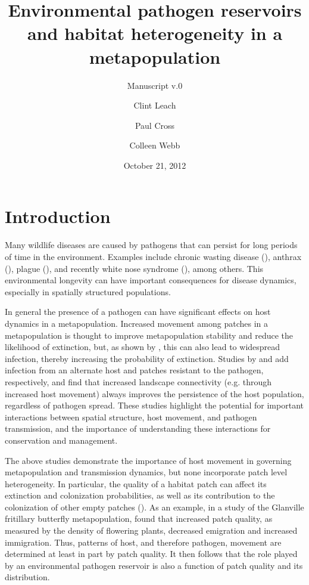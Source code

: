 \documentclass{svjour3}
\begin{document}
\title{Environmental pathogen reservoirs and habitat heterogeneity in a metapopulation}
\subtitle{Manuscript v.0}

\author{Clint Leach \and Paul Cross \and Colleen Webb}


\date{October 21, 2012}


\maketitle

\section{Introduction}
\label{intro}

Many wildlife diseases are caused by pathogens that can persist for long periods of time in the environment.  Examples include chronic wasting disease (\cite{Miller2006}), anthrax (\cite{Dragon1995}), plague (\cite{Eisen2008}), and recently white nose syndrome (\cite{Lindner2011}), among others.  This environmental longevity can have important consequences for disease dynamics, especially in spatially structured populations.

In general the presence of a pathogen can have significant effects on host dynamics in a metapopulation.  Increased movement among patches in a metapopulation is thought to improve metapopulation stability and reduce the likelihood of extinction, but, as shown by \cite{Hess1996}, this can also lead to widespread infection, thereby increasing the probability of extinction.  Studies by \cite{Gog2002} and \cite{McCallum2002} add infection from an alternate host and patches resistant to the pathogen, respectively, and find that increased landscape connectivity (e.g. through increased host movement) always improves the persistence of the host population, regardless of pathogen spread.  These studies highlight the potential for important interactions between spatial structure, host movement, and pathogen transmission, and the importance of understanding these interactions for conservation and management.

The above studies demonstrate the importance of host movement in governing metapopulation and transmission dynamics, but none incorporate patch level heterogeneity.  In particular, the quality of a habitat patch can affect its extinction and colonization probabilities, as well as its contribution to the colonization of other empty patches (\cite{Moilanen1998}).  As an example, in a study of the Glanville fritillary butterfly metapopulation, \cite{Moilanen1998} found that increased patch quality, as measured by the density of flowering plants, decreased emigration and increased immigration.  Thus, patterns of host, and therefore pathogen, movement are determined at least in part by patch quality.  It then follows that the role played by an environmental pathogen reservoir is also a function of patch quality and its distribution.
\end{document}
